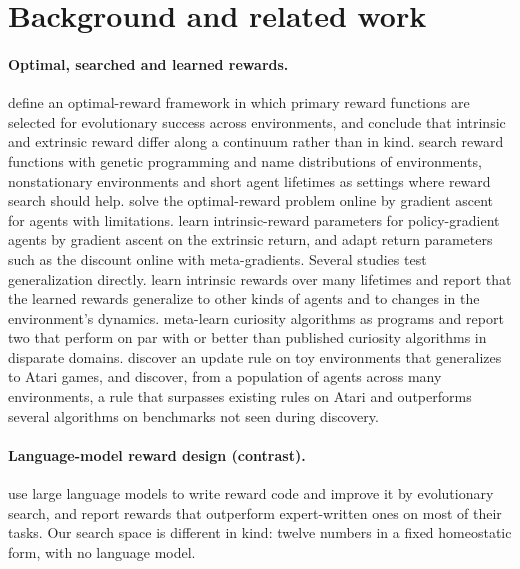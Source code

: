 \documentclass[11pt,letterpaper]{article}
\begin{document}
\section{Background and related work}
\label{sec:related}

\paragraph{Optimal, searched and learned rewards.} \citet{singh2010intrinsically} define an optimal-reward framework
in which primary reward functions are selected for evolutionary success across environments, and conclude that
intrinsic and extrinsic reward differ along a continuum rather than in kind. \citet{niekum2010genetic} search
reward functions with genetic programming and name distributions of environments, nonstationary environments and
short agent lifetimes as settings where reward search should help. \citet{sorg2010reward} solve the optimal-reward
problem online by gradient ascent for agents with limitations. \citet{zheng2018learning} learn intrinsic-reward
parameters for policy-gradient agents by gradient ascent on the extrinsic return, and \citet{xu2018meta} adapt
return parameters such as the discount online with meta-gradients. Several studies test generalization directly.
\citet{zheng2020what} learn intrinsic rewards over many lifetimes and report that the learned rewards generalize to
other kinds of agents and to changes in the environment's dynamics. \citet{alet2020meta} meta-learn curiosity
algorithms as programs and report two that perform on par with or better than published curiosity algorithms in
disparate domains. \citet{oh2020discovering} discover an update rule on toy environments that generalizes to Atari
games, and \citet{oh2025discovering} discover, from a population of agents across many environments, a rule that
surpasses existing rules on Atari and outperforms several algorithms on benchmarks not seen during discovery.

\paragraph{Language-model reward design (contrast).} \citet{ma2024eureka} use large language models to write reward
code and improve it by evolutionary search, and report rewards that outperform expert-written ones on most of their
tasks. Our search space is different in kind: twelve numbers in a fixed homeostatic form, with no language model.
\end{document}
